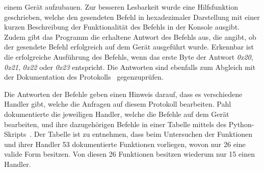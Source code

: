 einem Gerät aufzubauen.
Zur besseren Lesbarkeit wurde eine Hilfsfunktion geschrieben, welche den gesendeten Befehl in hexadezimaler Darstellung mit
einer kurzen Beschreibung der Funktionalität des Befehls in der Konsole ausgibt.
Zudem gibt das Programm die erhaltene Antwort des Befehls aus, die angibt, ob der gesendete Befehl erfolgreich auf dem
Gerät ausgeführt wurde.
Erkennbar ist die erfolgreiche Ausführung des Befehls, wenn das erste Byte der Antwort \textit{0x20}, \textit{0x21}, \textit{0x22}
oder \textit{0x23} entspricht.
Die Antworten sind ebenfalls zum Abgleich mit der Dokumentation des Protokolls~\cite{binary-prot-doc} gegenzuprüfen.

Die Antworten der Befehle geben einen Hinweis darauf, dass es verschiedene Handler gibt, welche die Anfragen auf diesem Protokoll
bearbeiten.
Pahl dokumentierte die jeweiligen Handler, welche die Befehle auf dem Gerät bearbeiten, und ihre dazugehörigen Befehle
in einer Tabelle mittels des Python-Skripts~\cite{handler-table}.
Der Tabelle ist zu entnehmen, dass beim Untersuchen der Funktionen und ihrer Handler 53 dokumentierte Funktionen
vorliegen, wovon nur 26 eine valide Form besitzen.
Von diesen 26 Funktionen besitzen wiederum nur 15 einen Handler.
